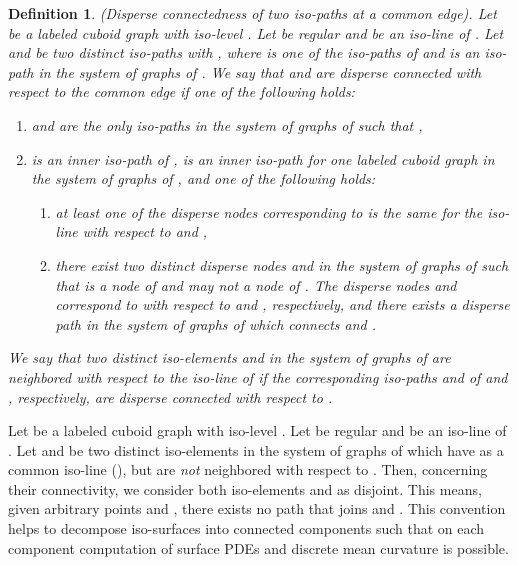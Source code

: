 \documentclass[a4paper,11pt]{article}
\newtheorem{definition}[theorem]{Definition}
\begin{document}
\begin{definition}(Disperse connectedness of two iso-paths at a common edge). Let  be
a labeled cuboid graph with iso-level . Let  be regular and  be an iso-line of .
Let  and  be two distinct iso-paths with , where 
is one of the iso-paths of  and  is an iso-path in the system of graphs of . We say that
 and  are disperse connected with respect to the common edge  if one of the
following holds:
\begin{enumerate}
\item  and  are the only iso-paths in the system of graphs of  such that
,
\item  is an inner iso-path of ,  is an inner iso-path for one labeled cuboid
graph in the system of graphs of , and one of the following holds:
\begin{enumerate}
\item at least one of the disperse nodes corresponding to  is the same for the iso-line  with
respect to  and ,
\item there exist two distinct disperse nodes  and  in the system of graphs of  such that
 is a node of  and  may not a node of . The disperse nodes  and  correspond
to  with respect to  and , respectively, and there exists a disperse path in the
system of graphs of  which connects  and .
\end{enumerate}
\end{enumerate}
We say that two distinct iso-elements  and  in the system of
graphs of  are {\it neighbored} with respect to the iso-line  of  if the corresponding
iso-paths  and  of  and , respectively, are disperse connected with respect
to .
\label{def:component-1}
\end{definition}

Let  be  a labeled cuboid graph
with iso-level . Let  be regular and  be an iso-line of . Let  and  be two
distinct iso-elements in the system of graphs of  which have  as a common iso-line (),
but are {\it not} neighbored with respect to . Then, concerning their connectivity, we consider both
iso-elements  and  as disjoint. This means, given arbitrary points  and ,
there exists no path  that joins  and . This convention helps to
decompose iso-surfaces into connected components such that on each component computation of surface PDEs
and discrete mean curvature is possible.\\
\end{document}
